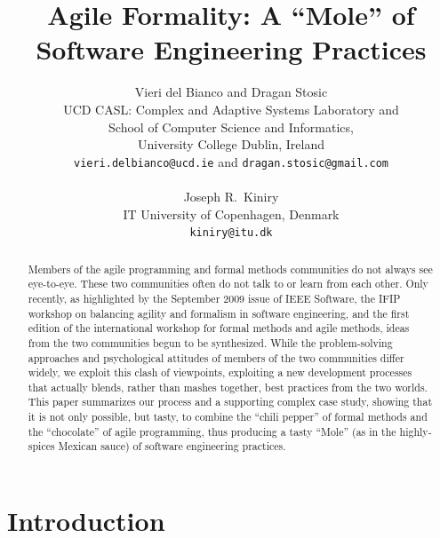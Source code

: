 \documentclass[english]{lni}
\begin{document}
\title{Agile Formality: A ``Mole'' of Software Engineering Practices}

\author{Vieri del Bianco and Dragan Stosic\\
  UCD CASL: Complex and Adaptive Systems Laboratory and\\
  School of Computer Science and Informatics,\\
  University College Dublin, Ireland\\
  \texttt{vieri.delbianco@ucd.ie} and \texttt{dragan.stosic@gmail.com}\\
  \\
  Joseph R.~Kiniry \\
  IT University of Copenhagen, Denmark\\
  \texttt{kiniry@itu.dk}
}

\maketitle

\begin{abstract}

Members of the agile programming and formal methods communities do not always see eye-to-eye.  
These two communities often do not talk to or learn from each other.  
Only recently, as highlighted by the September 2009 issue of IEEE Software, the IFIP workshop on balancing agility and formalism in software engineering, and the first edition of the international workshop for formal methods and agile methods, ideas from the two communities begun to be synthesized.  
While the problem-solving approaches and psychological attitudes of members of the two communities differ widely, we exploit this clash of viewpoints, exploiting a new development processes that actually blends, rather than mashes together, best practices from the two worlds.  
This paper summarizes our process and a supporting complex case study, showing that it is not only possible, but tasty, to combine the ``chili pepper'' of formal methods and the ``chocolate'' of agile programming, thus producing a tasty ``Mole'' (as in the highly-spices Mexican sauce) of software engineering practices.

\end{abstract}

\section{Introduction}
\label{sec:introduction}
\end{document}
